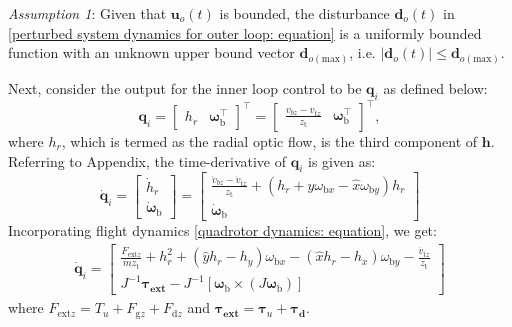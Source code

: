 \documentclass[lettersize,journal]{IEEEtran}
\begin{document}
\textit{Assumption 1}: Given that $\boldsymbol{u}_o(t)$ is bounded, the disturbance $\boldsymbol{d}_o(t)$ in \eqref{perturbed system dynamics for outer loop: equation} is a uniformly bounded function with an unknown upper bound vector $\boldsymbol{d}_{o(\text{max})}$, i.e. $\lvert \boldsymbol{d}_o(t) \rvert \leq \boldsymbol{d}_{o(\text{max})}$.

Next, consider the output for the inner loop control to be $\boldsymbol{q}_i$ as defined below:
\begin{equation}
    \boldsymbol{q}_i = \begin{bmatrix} h_r & \boldsymbol{\omega}_{\text{b}}^{\top} \end{bmatrix}^{\top} = \begin{bmatrix} \frac{v_{bz} - v_{tz}}{z_{\text{t}}} & \boldsymbol{\omega}_{\text{b}}^{\top}
    \end{bmatrix}^{\top},
\end{equation}
where $h_r$, which is termed as the radial optic flow, is the third component of $\boldsymbol{h}$.
Referring to Appendix, the time-derivative of $\boldsymbol{q}_i$ is given as:
\begin{equation}
    \dot{\boldsymbol{q}}_i = \begin{bmatrix} \dot{h}_r \\ \dot{\boldsymbol{\omega}}_{\text{b}} \end{bmatrix} = \begin{bmatrix}
        \frac{\dot{v}_{bz} - \dot{v}_{tz}}{z_{\text{t}}} + \left( h_r + \hat{y} \omega_{\text{b}x} - \hat{x} \omega_{\text{b}y} \right) h_r \\ \dot{\boldsymbol{\omega}}_{\text{b}}
    \end{bmatrix}
\end{equation}
Incorporating flight dynamics \eqref{quadrotor dynamics: equation}, we get:
\begin{align}
    \dot{\boldsymbol{q}}_i = \begin{bmatrix}
        \frac{F_{\text{ext}z}}{m z_{\text{t}}} + h_r^2 + \left( \hat{y} h_r - h_y \right) \omega_{\text{b}x} - \left( \hat{x} h_r - h_x \right) \omega_{\text{b}y} - \frac{\dot{v}_{\text{t}z}}{z_{\text{t}}} \\ J^{-1} \boldsymbol{\tau_{\text{ext}}} - J^{-1} \left[ \boldsymbol{\omega}_{\text{b}} \times (J \boldsymbol{\omega}_{\text{b}}) \right]
    \end{bmatrix}
\end{align}
where $F_{\text{ext}z} = T_u + F_{\text{g}z} + F_{\text{d}z}$ and $\boldsymbol{\tau_{\text{ext}}} = \boldsymbol{\tau}_u + \boldsymbol{\tau_{\text{d}}}$.
\end{document}
